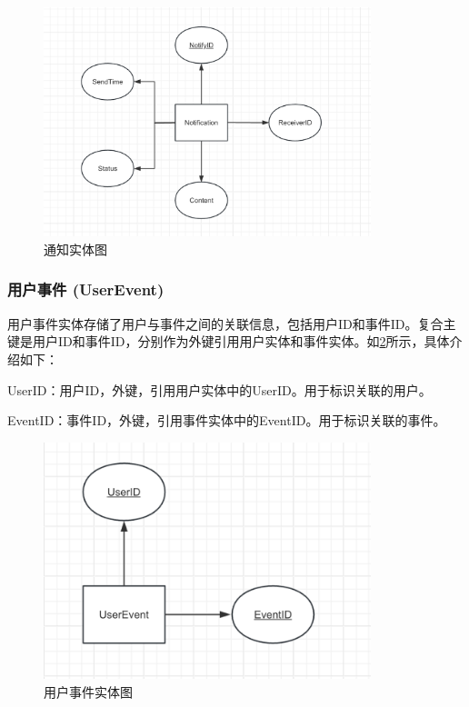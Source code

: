\begin{figure}[htbp]
    \centering
    \includegraphics[width=0.85\textwidth]{figures/db-img-04.png}
    \caption{通知实体图}
    \label{fig:entity-notification}
\end{figure}

\subsubsection{用户事件 (UserEvent)}

用户事件实体存储了用户与事件之间的关联信息，包括用户ID和事件ID。复合主键是用户ID和事件ID，分别作为外键引用用户实体和事件实体。如\cref{fig:entity-userevent}所示，具体介绍如下：

UserID：用户ID，外键，引用用户实体中的UserID。用于标识关联的用户。

EventID：事件ID，外键，引用事件实体中的EventID。用于标识关联的事件。

\begin{figure}[htbp]
    \centering
    \includegraphics[width=0.85\textwidth]{figures/db-img-05.png}
    \caption{用户事件实体图}
    \label{fig:entity-userevent}
\end{figure}


